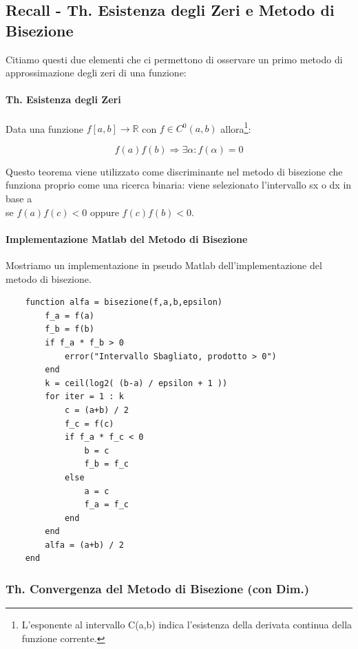 \documentclass{article}
\begin{document}
\subsection{Recall - Th. Esistenza degli Zeri e Metodo di Bisezione}

Citiamo questi due elementi che ci permettono di osservare un primo metodo di approssimazione degli zeri di una funzione:

\paragraph{Th. Esistenza degli Zeri} Data una funzione $f[a,b] \rightarrow \mathbb{R}$ con $f \in C^{0}(a,b)$ allora\footnote{L'esponente al intervallo C(a,b) indica l'esistenza della derivata continua della funzione corrente.}:

\[ \boxed{f(a)f(b) \Rightarrow \exists \alpha : f(\alpha) = 0} \]

Questo teorema viene utilizzato come discriminante nel metodo di bisezione che funziona proprio come una ricerca binaria: viene selezionato l'intervallo sx o dx in base a \\ se $f(a)f(c) < 0$ oppure $f(c)f(b) < 0$.

\paragraph{Implementazione Matlab del Metodo di Bisezione} Mostriamo un implementazione in pseudo Matlab dell'implementazione del metodo di bisezione.

\vspace*{8px}

\begin{lstlisting}
    function alfa = bisezione(f,a,b,epsilon)
        f_a = f(a)
        f_b = f(b)
        if f_a * f_b > 0
            error("Intervallo Sbagliato, prodotto > 0")
        end
        k = ceil(log2( (b-a) / epsilon + 1 ))
        for iter = 1 : k
            c = (a+b) / 2
            f_c = f(c)
            if f_a * f_c < 0
                b = c
                f_b = f_c
            else
                a = c
                f_a = f_c
            end
        end
        alfa = (a+b) / 2
    end
\end{lstlisting}

\newpage

\subsubsection{Th. Convergenza del Metodo di Bisezione (con Dim.)}
\end{document}
